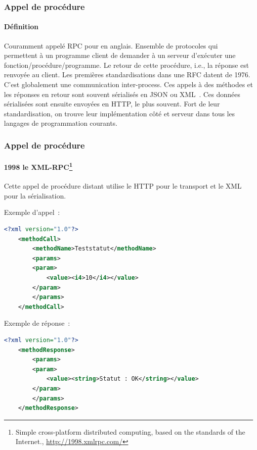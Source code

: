 \documentclass{beamer}
\begin{document}
    \begin{frame}
        \transdissolve
        \frametitle{Appel de procédure}
        \framesubtitle{Définition}
        Couramment appelé RPC pour  en anglais.
        \bigbreak
        Ensemble de protocoles qui permettent à un programme client de demander à un serveur d'exécuter une fonction/procédure/programme.
        Le retour de cette procédure, i.e., la réponse est renvoyée au client.
        \bigbreak
        Les premières standardisations dans une RFC datent de 1976.
        \bigbreak
        C'est globalement une communication inter-process.
        \bigbreak
        Ces appels à des méthodes et les réponses en retour sont souvent sérialisés en JSON ou XML~.
        Ces données sérialisées sont ensuite envoyées en HTTP, le plus souvent.
        \bigbreak
        Fort de leur standardisation, on trouve leur implémentation côté et serveur dans tous les langages de programmation courants.
    \end{frame}

    \begin{frame}[fragile]
        \transdissolve
        \frametitle{Appel de procédure}
        \framesubtitle{1998 le XML-RPC\footnote{Simple cross-platform distributed computing, based on the standards of the Internet., \url{http://1998.xmlrpc.com/}}}
        Cette appel de procédure distant utilise le HTTP pour le transport et le XML pour la sérialisation.

        Exemple d'appel~:
        \begin{lstlisting}[language=xml,basicstyle=\ttfamily\tiny]
<?xml version="1.0"?>
    <methodCall>
        <methodName>Teststatut</methodName>
        <params>
        <param>
            <value><i4>10</i4></value>
        </param>
        </params>
    </methodCall>
        \end{lstlisting}
        Exemple de réponse~:
        \begin{lstlisting}[language=xml,basicstyle=\ttfamily\tiny]
<?xml version="1.0"?>
    <methodResponse>
        <params>
        <param>
            <value><string>Statut : OK</string></value>
        </param>
        </params>
    </methodResponse>
        \end{lstlisting}
    \end{frame}
\end{document}

